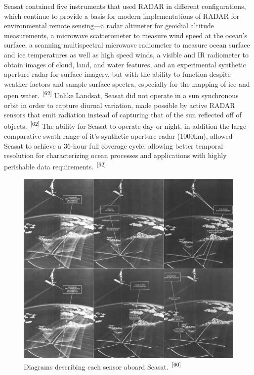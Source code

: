 \documentclass{article}
\begin{document}

\par{Seasat contained five instruments that used RADAR in different configurations, which continue to provide a basis for modern implementations of RADAR for environmental remote sensing---a radar altimeter for geoidial altitude measurements, a microwave scatterometer to measure wind speed at the ocean's surface, a scanning multispectral microwave radiometer to measure ocean surface and ice temperatures as well as high speed winds, a visible and IR radiometer to obtain images of cloud, land, and water features, and an experimental synthetic aperture radar for surface imagery, but with the ability to function despite weather factors and sample surface spectra, especially for the mapping of ice and open water.~\textsuperscript{[62]} Unlike Landsat, Seasat did not operate in a sun synchronous orbit in order to capture diurnal variation, made possible by active RADAR sensors that emit radiation instead of capturing that of the sun reflected off of objects.~\textsuperscript{[62]} The ability for Seasat to operate day or night, in addition the large comparative swath range of it's synthetic aperture radar (1000km), allowed Seasat to achieve a 36-hour full coverage cycle, allowing better temporal resolution for characterizing ocean processes and applications with highly perishable data requirements.~\textsuperscript{[62]}}


\begin{figure}
    \centering
    \includegraphics[width=0.8\linewidth]{images/seasat-sensors.png}
    \caption{Diagrams describing each sensor aboard Seasat.~\textsuperscript{[60]}}
    \label{figure17}
\end{figure}
\end{document}
